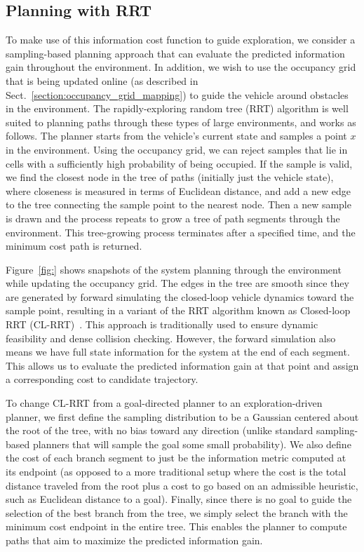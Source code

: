 \subsection{Planning with RRT}
\label{sec:planner}

To make use of this information cost function to guide exploration, we consider a sampling-based planning approach that can evaluate the predicted information gain throughout the environment. In addition, we wish to use the occupancy grid that is being updated online (as described in Sect.~\ref{section:occupancy_grid_mapping}) to guide the vehicle around obstacles in the environment. The rapidly-exploring random tree (RRT) algorithm is well suited to planning paths through these types of large environments, and works as follows.
The planner starts from the vehicle's current state and samples a point $x$ in the environment. Using the occupancy grid, we can reject samples that lie in cells with a sufficiently high probability of being occupied. If the sample is valid, we find the closest node in the tree of paths (initially just the vehicle state), where closeness is measured in terms of Euclidean distance, and add a new edge to the tree connecting the sample point to the nearest node.
Then a new sample is drawn and the process repeats to grow a tree of path segments through the environment. This tree-growing process terminates after a specified time, and the minimum cost path is returned.

Figure~\ref{fig:} shows snapshots of the system planning through the environment while updating the occupancy grid. The edges in the tree are smooth since they are generated by forward simulating the closed-loop vehicle dynamics toward the sample point, resulting in a variant of the RRT algorithm known as Closed-loop RRT (CL-RRT)~\cite{Kuwata09_TCST}. This approach is traditionally used to ensure dynamic feasibility and dense collision checking. However, the forward simulation also means we have full state information for the system at the end of each segment. This allows us to evaluate the predicted information gain at that point and assign a corresponding cost to candidate trajectory. 

To change CL-RRT from a goal-directed planner to an exploration-driven planner, we first define the sampling distribution to be a Gaussian centered about the root of the tree, with no bias toward any direction (unlike standard sampling-based planners that will sample the goal some small probability). We also define the cost of each branch segment to just be the information metric computed at its endpoint (as opposed to a more traditional setup where the cost is the total distance traveled from the root plus a cost to go based on an admissible heuristic, such as Euclidean distance to a goal). Finally, since there is no goal to guide the selection of the best branch from the tree, we simply select the branch with the minimum cost endpoint in the entire tree. This enables the planner to compute paths that aim to maximize the predicted information gain.


